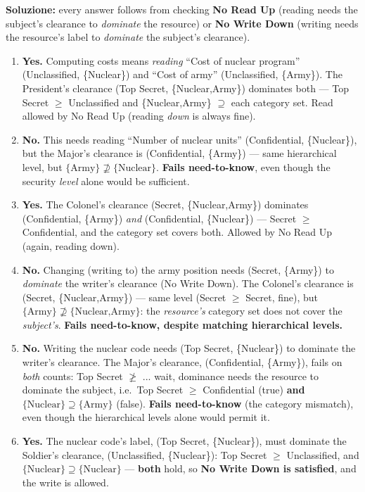 \documentclass[12pt, a4paper]{article}
\begin{document}
\textbf{Soluzione:} every answer follows from checking \textbf{No Read Up} (reading needs the subject's clearance to \emph{dominate} the resource) or \textbf{No Write Down} (writing needs the resource's label to \emph{dominate} the subject's clearance).
\begin{enumerate}
    \item \textbf{Yes.} Computing costs means \emph{reading} ``Cost of nuclear program'' (Unclassified, \{Nuclear\}) and ``Cost of army'' (Unclassified, \{Army\}). The President's clearance (Top Secret, \{Nuclear,Army\}) dominates both --- Top Secret $\geq$ Unclassified and \{Nuclear,Army\} $\supseteq$ each category set. Read allowed by No Read Up (reading \emph{down} is always fine).
    \item \textbf{No.} This needs reading ``Number of nuclear units'' (Confidential, \{Nuclear\}), but the Major's clearance is (Confidential, \{Army\}) --- same hierarchical level, but $\{\text{Army}\} \not\supseteq \{\text{Nuclear}\}$. \textbf{Fails need-to-know}, even though the security \emph{level} alone would be sufficient.
    \item \textbf{Yes.} The Colonel's clearance (Secret, \{Nuclear,Army\}) dominates (Confidential, \{Army\}) \emph{and} (Confidential, \{Nuclear\}) --- Secret $\geq$ Confidential, and the category set covers both. Allowed by No Read Up (again, reading down).
    \item \textbf{No.} Changing (writing to) the army position needs (Secret, \{Army\}) to \emph{dominate} the writer's clearance (No Write Down). The Colonel's clearance is (Secret, \{Nuclear,Army\}) --- same level (Secret $\geq$ Secret, fine), but $\{\text{Army}\} \not\supseteq \{\text{Nuclear,Army}\}$: the \emph{resource's} category set does not cover the \emph{subject's}. \textbf{Fails need-to-know, despite matching hierarchical levels.}
    \item \textbf{No.} Writing the nuclear code needs (Top Secret, \{Nuclear\}) to dominate the writer's clearance. The Major's clearance, (Confidential, \{Army\}), fails on \emph{both} counts: Top Secret $\not\geq$ ... wait, dominance needs the resource to dominate the subject, i.e.\ Top Secret $\geq$ Confidential (true) \textbf{and} $\{\text{Nuclear}\} \supseteq \{\text{Army}\}$ (false). \textbf{Fails need-to-know} (the category mismatch), even though the hierarchical levels alone would permit it.
    \item \textbf{Yes.} The nuclear code's label, (Top Secret, \{Nuclear\}), must dominate the Soldier's clearance, (Unclassified, \{Nuclear\}): Top Secret $\geq$ Unclassified, and $\{\text{Nuclear}\}\supseteq\{\text{Nuclear}\}$ --- \textbf{both} hold, so \textbf{No Write Down is satisfied}, and the write is allowed.

\end{enumerate}
\end{document}
